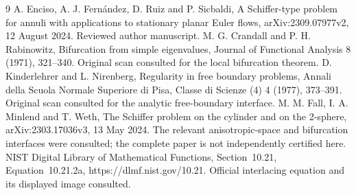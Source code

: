 \documentclass[10pt]{article}
\begin{document}
9 A. Enciso, A. J. Fernández, D. Ruiz and P. Sicbaldi, A Schiffer-type problem for annuli with applications to stationary planar Euler flows, arXiv:2309.07977v2, 12 August 2024. Reviewed author manuscript. M. G. Crandall and P. H. Rabinowitz, Bifurcation from simple eigenvalues, Journal of Functional Analysis 8 (1971), 321–340. Original scan consulted for the local bifurcation theorem. D. Kinderlehrer and L. Nirenberg, Regularity in free boundary problems, Annali della Scuola Normale Superiore di Pisa, Classe di Scienze (4) 4 (1977), 373–391. Original scan consulted for the analytic free-boundary interface. M. M. Fall, I. A. Minlend and T. Weth, The Schiffer problem on the cylinder and on the 2-sphere, arXiv:2303.17036v3, 13 May 2024. The relevant anisotropic-space and bifurcation interfaces were consulted; the complete paper is not independently certified here. NIST Digital Library of Mathematical Functions, Section 10.21, Equation 10.21.2a, https://dlmf.nist.gov/10.21. Official interlacing equation and its displayed image consulted.\par
\end{document}
